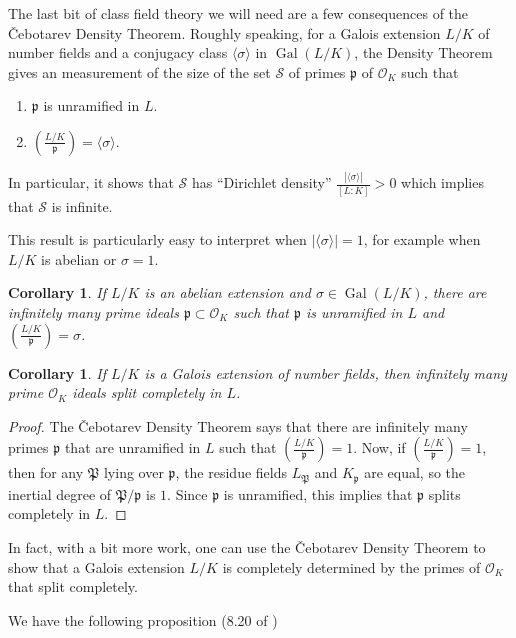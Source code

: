 \documentclass{amsart}
\newtheorem{cor}[thm]{Corollary}
\theoremstyle{definition}
\theoremstyle{remark}
\numberwithin{equation}{section}
\newcommand{\cO}{\mathcal O}
\newcommand{\cS}{\mathcal S}
\newcommand{\fkp}{\mathfrak p}
\newcommand{\fkP}{\mathfrak{P}}
\newcommand{\artin}[2]{\left( \frac{#1}{#2}\right)}
\DeclareMathOperator{\Gal}{Gal}
\begin{document}
The last bit of class field theory we will need are a few consequences of the \v{C}ebotarev Density Theorem. Roughly speaking, for a Galois extension $L/K$ of number fields and a conjugacy class $\langle \sigma \rangle$ in $\Gal(L/K)$, the Density Theorem gives an measurement of the size of the set $\cS$ of primes $\fkp$ of $\cO_{K}$ such that
\begin{enumerate}
\item $\fkp$ is unramified in $L$.
\item $\artin{L/K}{\fkp} = \langle \sigma \rangle$.
\end{enumerate}
In particular, it shows that $\cS$ has ``Dirichlet density'' $\frac{|\langle \sigma \rangle|}{[L:K]} > 0$ which implies that $\cS$ is infinite.

This result is particularly easy to interpret when $|\langle \sigma \rangle | = 1$, for example when $L/K$ is abelian or $\sigma = 1$.

\begin{cor}
If $L/K$ is an abelian extension and $\sigma \in \Gal(L/K)$, there are infinitely many prime ideals $\fkp \subset \cO_{K}$ such that $\fkp$ is unramified in $L$ and $\artin{L/K}{\fkp} = \sigma$.
\end{cor}

\begin{cor} \label{cor:InfiniteSplitCompletely}
If $L/K$ is a Galois extension of number fields, then infinitely many prime $\cO_{K}$ ideals split completely in $L$.
\end{cor}

\begin{proof}
The \v{C}ebotarev Density Theorem says that there are infinitely many primes $\fkp$ that are unramified in $L$ such that $\artin{L/K}{\fkp} = 1$. Now, if $\artin{L/K}{\fkp} = 1$, then for any $\fkP$ lying over $\fkp$, the residue fields $L_{\fkP}$ and $K_{\fkp}$ are equal, so the inertial degree of $\fkP/\fkp$ is $1$. Since $\fkp$ is unramified, this implies that $\fkp$ splits completely in $L$.
\end{proof}

In fact, with a bit more work, one can use the \v{C}ebotarev Density Theorem to show that a Galois extension $L/K$ is completely determined by the primes of $\cO_{K}$ that split completely. 

We have the following proposition (8.20 of \cite{CoxPrimes})

\end{document}
